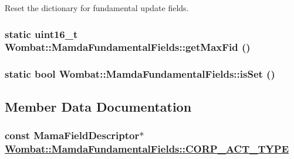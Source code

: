 Reset the dictionary for fundamental update fields. 

\hypertarget{classWombat_1_1MamdaFundamentalFields_e70f8c7677b393d516ce92bc40ae9f1d}{
\subsubsection[getMaxFid]{\setlength{\rightskip}{0pt plus 5cm}static uint16\_\-t Wombat::Mamda\-Fundamental\-Fields::get\-Max\-Fid ()}}
\label{classWombat_1_1MamdaFundamentalFields_e70f8c7677b393d516ce92bc40ae9f1d}


\hypertarget{classWombat_1_1MamdaFundamentalFields_e76100283fe238a51a604d7a453d5681}{
\subsubsection[isSet]{\setlength{\rightskip}{0pt plus 5cm}static bool Wombat::Mamda\-Fundamental\-Fields::is\-Set ()}}
\label{classWombat_1_1MamdaFundamentalFields_e76100283fe238a51a604d7a453d5681}




\subsection{Member Data Documentation}
\hypertarget{classWombat_1_1MamdaFundamentalFields_81cceb7f9ea585eb1d7d6dc515e961e9}{
\subsubsection[CORP\_\-ACT\_\-TYPE]{\setlength{\rightskip}{0pt plus 5cm}const Mama\-Field\-Descriptor$\ast$ \hyperlink{classWombat_1_1MamdaFundamentalFields_81cceb7f9ea585eb1d7d6dc515e961e9}{Wombat::Mamda\-Fundamental\-Fields::CORP\_\-ACT\_\-TYPE}}}
\label{classWombat_1_1MamdaFundamentalFields_81cceb7f9ea585eb1d7d6dc515e961e9}


